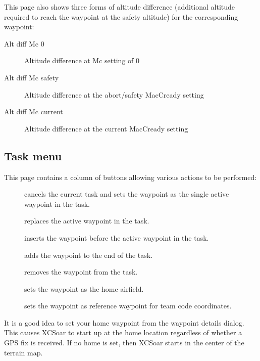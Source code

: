 \documentclass[a4paper,12pt]{refrep}
\begin{document}
This page also shows three forms of altitude difference (additional
altitude required to reach the waypoint at the safety altitude) for
the corresponding waypoint:
\begin{description}
\item[Alt diff Mc 0] Altitude difference at Mc setting of 0
\item[Alt diff Mc safety] Altitude difference at the abort/safety MacCready setting
\item[Alt diff Mc current] Altitude difference at the current MacCready setting
\end{description}

\subsection*{Task menu}  
This page contains a column of buttons allowing various actions to be performed:
\begin{description}
\item[] cancels the current task and sets the waypoint as the
  single active waypoint in the task.
\item[] replaces the active waypoint in the task.
\item[] inserts the waypoint before the active waypoint in
  the task.
\item[] adds the waypoint to the end of the task.
\item[] removes the waypoint from the task.
\item[] sets the waypoint as the home airfield.
\item[] sets the waypoint as reference waypoint for
  team code coordinates.

\end{description}

It is a good idea to set your home waypoint from the waypoint details
dialog. This causes XCSoar to start up at the home location regardless
of whether a GPS fix is received.  If no home is set, then XCSoar
starts in the center of the terrain map.
\end{document}
